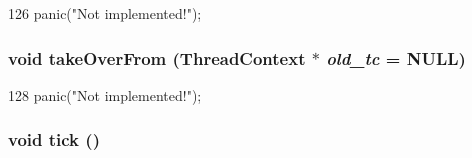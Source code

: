 \begin{DoxyCode}
126 { panic("Not implemented!"); }
\end{DoxyCode}
\hypertarget{classInorderBackEnd_a5a901e7ec5b94a55bd61fde88ad0b7f1}{
\subsubsection[{takeOverFrom}]{\setlength{\rightskip}{0pt plus 5cm}void takeOverFrom ({\bf ThreadContext} $\ast$ {\em old\_\-tc} = {\ttfamily NULL})}}
\label{classInorderBackEnd_a5a901e7ec5b94a55bd61fde88ad0b7f1}



\begin{DoxyCode}
128 { panic("Not implemented!"); }
\end{DoxyCode}
\hypertarget{classInorderBackEnd_a873dd91783f9efb4a590aded1f70d6b0}{
\subsubsection[{tick}]{\setlength{\rightskip}{0pt plus 5cm}void tick ()}}
\label{classInorderBackEnd_a873dd91783f9efb4a590aded1f70d6b0}



